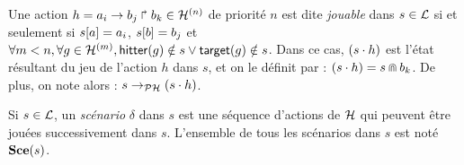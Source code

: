 \begin{definition}
  Une action $h = a_i\rightarrow b_j\Rsh b_k \in \mathcal{H}^{(n)}$ de priorité $n$ est dite \emph{jouable}
  dans $s \in \mathcal{L}$ si et seulement si ${s[a]} = a_i$, ${s[b]} = b_j$
  et $\forall m < n, \forall g \in \mathcal{H}^{(m)}, \mathsf{hitter}(g) \notin s \vee \mathsf{target}(g) \notin s$.
  Dans ce cas, $(s \cdot h)$ est l'état résultant du jeu de l'action $h$ dans $s$,
  et on le définit par : $(s \cdot h) = s \Cap b_k$.
  De plus, on note alors : $s \rightarrow_{\mathcal{PH}} (s \cdot h)$.

  Si $s \in \mathcal{L}$, un \emph{scénario} $\delta$ dans $s$
  est une séquence d'actions de $\mathcal{H}$ qui peuvent être jouées successivement dans $s$.
  L'ensemble de tous les scénarios dans $s$ est noté $\mathbf{Sce}(s)$.
\end{definition}
